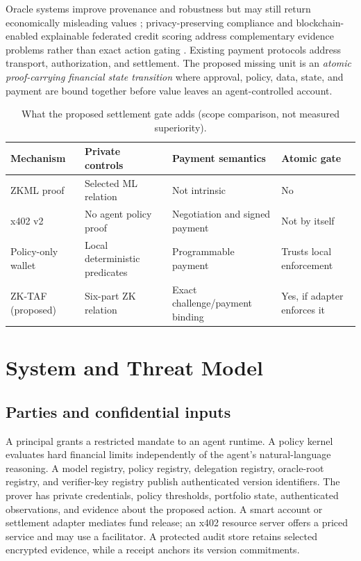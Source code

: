 \documentclass[conference]{IEEEtran}
\newcommand{\zktaf}{\textsc{ZK-TAF}}
\begin{document}
Oracle systems improve provenance and robustness but may still return economically misleading values \cite{acon22023}; privacy-preserving compliance and blockchain-enabled explainable federated credit scoring address complementary evidence problems rather than exact action gating \cite{buterin2024,jovanovic2024}. Existing payment protocols address transport, authorization, and settlement. The proposed missing unit is an \emph{atomic proof-carrying financial state transition} where approval, policy, data, state, and payment are bound together before value leaves an agent-controlled account.

\begin{table}[t]
\caption{What the proposed settlement gate adds (scope comparison, not measured superiority).}
\label{tab:gap}
\centering\footnotesize
\setlength{\tabcolsep}{3pt}
\begin{tabularx}{\columnwidth}{@{}lXXX@{}}
\toprule
Mechanism & Private controls & Payment semantics & Atomic gate \\
\midrule
ZKML proof & Selected ML relation & Not intrinsic & No \\
x402 v2 & No agent policy proof & Negotiation and signed payment & Not by itself \\
Policy-only wallet & Local deterministic predicates & Programmable payment & Trusts local enforcement \\
\zktaf{} (proposed) & Six-part ZK relation & Exact challenge/payment binding & Yes, if adapter enforces it \\
\bottomrule
\end{tabularx}
\end{table}

\section{System and Threat Model}
\subsection{Parties and confidential inputs}
A principal grants a restricted mandate to an agent runtime. A policy kernel evaluates hard financial limits independently of the agent's natural-language reasoning. A model registry, policy registry, delegation registry, oracle-root registry, and verifier-key registry publish authenticated version identifiers. The prover has private credentials, policy thresholds, portfolio state, authenticated observations, and evidence about the proposed action. A smart account or settlement adapter mediates fund release; an x402 resource server offers a priced service and may use a facilitator. A protected audit store retains selected encrypted evidence, while a receipt anchors its version commitments.
\end{document}
